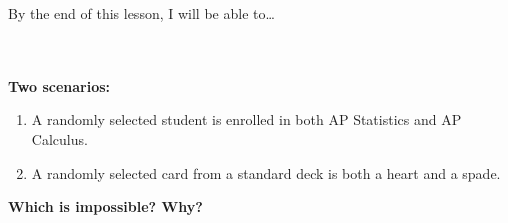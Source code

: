 \documentclass[10pt]{article}
\begin{document}
\namedateperiod

\vspace{0.12in}

\begin{objectivebox}
\small By the end of this lesson, I will be able to\dots\\[4pt]
\writeline\\[1pt]
\writeline\\[1pt]
\writeline
\end{objectivebox}

\vspace{0.1in}

\begin{vocabbox}
\end{vocabbox}

\vspace{0.1in}

\begin{hookbox}
\small
\textbf{Two scenarios:}
\begin{enumerate}[leftmargin=1.5em, itemsep=4pt]
  \item A randomly selected student is enrolled in both AP Statistics and AP Calculus.
  \item A randomly selected card from a standard deck is both a heart and a spade.
\end{enumerate}
\textbf{Which is impossible? Why?}\\[4pt]
\writeline\\[1pt]\writeline
\end{hookbox}

\vspace{0.1in}
\end{document}

